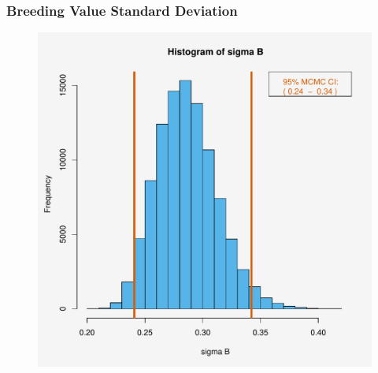 \documentclass[table]{beamer}
\begin{document}
\begin{frame}
  \frametitle{Breeding Value Standard Deviation}
  \begin{figure}
  \includegraphics[width=0.65\linewidth]{sigmaB_hist.pdf}
  \end{figure}
\end{frame}
\end{document}
